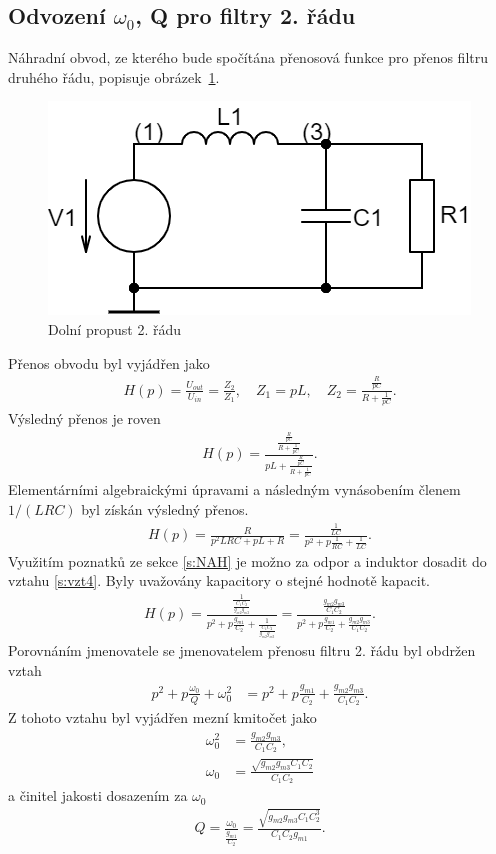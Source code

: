 \subsection{Odvození $\omega_0$, Q pro filtry 2. řádu}\label{s:ODV}
\noindent Náhradní obvod, ze kterého bude spočítána přenosová funkce pro přenos filtru druhého řádu, popisuje obrázek~\ref{s:DPO}.
\begin{figure}[h]
\centering
\includegraphics[scale=0.3]{circuit(1).png}
\caption{Dolní propust 2. řádu \label{s:DPO}} 
\end{figure}
\noindent Přenos obvodu byl vyjádřen jako
\begin{align}
H(p) = \frac{U_{out}}{U_{in}} = \frac{Z_2}{Z_1}, \quad Z_1 = pL,\quad Z_2 = \frac{\frac{R}{pC}}{R + \frac{1}{pC}}.
\end{align}
Výsledný přenos je roven 
\begin{align}
H(p) = \frac{\frac{\frac{R}{pC}}{R + \frac{1}{pC}}}{pL + \frac{\frac{R}{pC}}{R + \frac{1}{pC}}}.
\end{align}
Elementárními algebraickými úpravami a následným vynásobením členem $1/(LRC)$ byl získán výsledný přenos.
\begin{align}\label{s:vzt4}
H(p) = \frac{R}{p^2LRC + pL + R} = \frac{\frac{1}{LC}}{p^2 + p\frac{1}{RC} + \frac{1}{LC}}.
\end{align}
\noindent Využitím poznatků ze sekce \ref{s:NAH} je možno za odpor a induktor dosadit do vztahu \ref{s:vzt4}. Byly uvažovány kapacitory o stejné hodnotě kapacit.
\begin{align}
H(p) = \frac{\frac{1}{\frac{C_1C_2}{g_{m2}g_{m3}}}}{p^2 + p\frac{g_{m1}}{C_2} + \frac{1}{\frac{C_1C_2}{g_{m2}g_{m3}}}} = \frac{\frac{g_{m2}g_{m3}}{C_1C_2}}{p^2 + p\frac{g_{m1}}{C_2} + \frac{g_{m2}g_{m3}}{C_1C_2}}.
\end{align}
Porovnáním jmenovatele se jmenovatelem přenosu filtru 2. řádu byl obdržen vztah
\begin{align}
p^2 + p\frac{\omega _0}{Q} + \omega _0^2 &= p^2 + p\frac{g_{m1}}{C_2} + \frac{g_{m2}g_{m3}}{C_1C_2}.
\end{align}
Z tohoto vztahu byl vyjádřen mezní kmitočet jako 
\begin{align}
\omega _0^2 &= \frac{g_{m2}g_{m3}}{C_1C_2}, \\
\omega _0 &= \frac{\sqrt{g_{m2}g_{m3}C_1C_2}}{C_1C_2}
\end{align}
a činitel jakosti dosazením za $\omega _0$
\begin{align}
Q = \frac{\omega _0}{\frac{g_{m1}}{C_2}} = \frac{\sqrt{g_{m2}g_{m3}C_1C_2^3}}{C_1C_2g_{m1}}.
\end{align}
